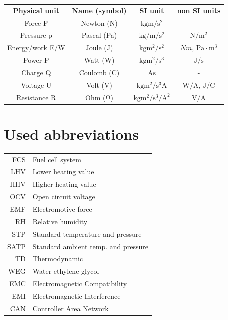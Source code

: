 \documentclass[11pt,a4paper,english,twoside]{scrreprt}
\begin{document}
\begin{tabular}{cccc}

\textbf{Physical unit} & \textbf{Name (symbol)} & \textbf{SI unit} & \textbf{non SI units} \\

Force F         & Newton (N)     & $\si{\kg\m\per\second\squared}$            & - \\
Pressure p      & Pascal (Pa)    & $\si{\kg\per\m\per\s\squared}$          & $\si{\N\per\meter\squared}$ \\
Energy/work E/W & Joule (J)      & $\si{\kg\m\squared\per\s\squared}$          & $\si{Nm}$, $\si{\Pa \cdot \m^3}$ \\
Power P         & Watt (W)       & $\si{\kg\m\squared\per\cubic\second}$          & $\si{\J\per\second}$ \\
Charge Q        & Coulomb (C)    & $\si{\ampere\second}$                   & - \\
Voltage U       & Volt (V)       & $\si{\kg\meter\squared\per\cubic\second\ampere}$   & $\si{\watt\per\ampere}$, $\si{\joule\per\coulomb}$ \\
Resistance R    & Ohm ($\si{\ohm}$) & $\si{\kg\meter\squared\per\cubic\second\per\ampere\squared}$ & $\si{\volt\per\ampere}$ \\

\end{tabular}


\section{Used abbreviations}

\begin{tabular}{rl}
FCS & Fuel cell system \\
LHV & Lower heating value \\
HHV & Higher heating value \\
OCV & Open circuit voltage \\
EMF & Electromotive force \\
RH & Relative humidity \\
STP & Standard temperature and pressure \\
SATP & Standard ambient temp. and pressure \\
TD & Thermodynamic \\
WEG & Water ethylene glycol \\
EMC & Electromagnetic Compatibility \\
EMI & Electromagnetic Interference \\
CAN & Controller Area Network
\end{tabular}
\end{document}
